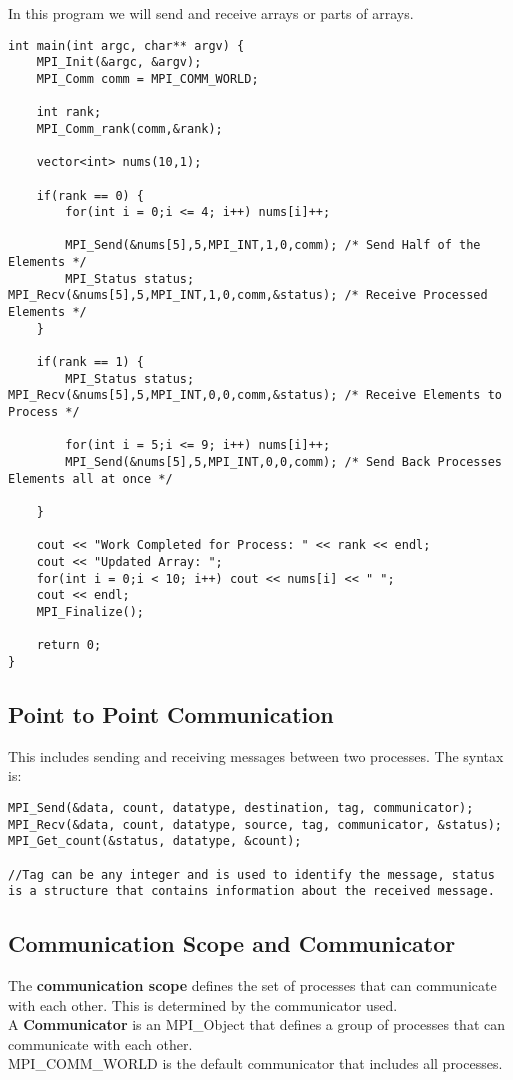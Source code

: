  In this program we will send and receive arrays or parts of arrays.

\begin{lstlisting}
int main(int argc, char** argv) {
    MPI_Init(&argc, &argv);
    MPI_Comm comm = MPI_COMM_WORLD;

    int rank;
    MPI_Comm_rank(comm,&rank);

    vector<int> nums(10,1);

    if(rank == 0) {
        for(int i = 0;i <= 4; i++) nums[i]++;

        MPI_Send(&nums[5],5,MPI_INT,1,0,comm); /* Send Half of the Elements */
        MPI_Status status; MPI_Recv(&nums[5],5,MPI_INT,1,0,comm,&status); /* Receive Processed Elements */
    }

    if(rank == 1) {
        MPI_Status status; MPI_Recv(&nums[5],5,MPI_INT,0,0,comm,&status); /* Receive Elements to Process */
                
        for(int i = 5;i <= 9; i++) nums[i]++;
        MPI_Send(&nums[5],5,MPI_INT,0,0,comm); /* Send Back Processes Elements all at once */
        
    }

    cout << "Work Completed for Process: " << rank << endl;
    cout << "Updated Array: ";
    for(int i = 0;i < 10; i++) cout << nums[i] << " ";
    cout << endl;
    MPI_Finalize();
    
    return 0;
}
\end{lstlisting}

\subsection*{Point to Point Communication}
This includes sending and receiving messages between two processes. The syntax is: \\
\begin{lstlisting}
MPI_Send(&data, count, datatype, destination, tag, communicator);
MPI_Recv(&data, count, datatype, source, tag, communicator, &status);
MPI_Get_count(&status, datatype, &count);

//Tag can be any integer and is used to identify the message, status is a structure that contains information about the received message.
\end{lstlisting}

\subsection*{Communication Scope and Communicator}
The \textbf{communication scope} defines the set of processes that can communicate with each other. This is determined by the communicator used. \\
A \textbf{Communicator} is an MPI\_Object that defines a group of processes that can communicate with each other.\\ MPI\_COMM\_WORLD is the default communicator that includes all processes. \\
